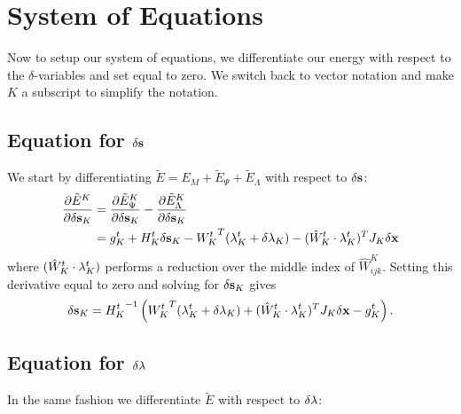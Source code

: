 
\section{System of Equations}
Now to setup our system of equations, we differentiate our energy with respect to the $\delta$-variables and set equal to zero. We switch back to vector notation and make $K$ a subscript to simplify the notation.

\subsection{Equation for $\delta \mathbf{s}$}
We start by differentiating $\tilde{E} = E_M + \tilde{E}_\Psi + \tilde{E}_\Lambda$ with respect to $\delta \mathbf{s}$:
\begin{equation}
\begin{split}
\frac{\partial \tilde{E}^K}{\partial \delta \mathbf{s}_K} &= \frac{\partial \tilde{E}^K_\Psi}{\partial \delta \mathbf{s}_K} - \frac{\partial \tilde{E}^K_\Lambda}{\partial \delta \mathbf{s}_K} \\
&= g_K^t + H_K^t \delta \mathbf{s}_K - {W_K^t}^T (\mathbf{\lambda}_K^t + \delta \mathbf{\lambda}_K) - (\hat{W}_K^{t}\cdot \mathbf{\lambda}_K^t)^T J_K \delta \mathbf{x}
\end{split}
\end{equation}
where $(\hat{W}_K^{t}\cdot \mathbf{\lambda}_K^t)$ performs a reduction over the middle index of $\hat{W}^K_{ijk}$. Setting this derivative equal to zero and solving for $\delta \mathbf{s}_K$ gives
\begin{equation}
\delta \mathbf{s}_K = {H_K^t}^{-1} \left( {W_K^t}^T (\mathbf{\lambda}_K^t + \delta \mathbf{\lambda}_K) + (\hat{W}_K^{t}\cdot \mathbf{\lambda}_K^t)^T J_K \delta \mathbf{x} - g_K^t \right).
\end{equation}

\subsection{Equation for $\delta \mathbf{\lambda}$}
In the same fashion we differentiate $\tilde{E}$ with respect to $\delta \mathbf{\lambda}$:

